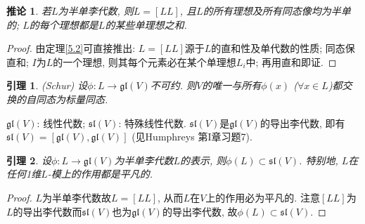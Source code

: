 \documentclass{ctexart}%
\newtheorem{lemma}{引理}
\newtheorem{corollary}{推论}
\theoremstyle{definition}
\theoremstyle{remark}
\begin{document}
\begin{corollary}
若$L$为半单李代数, 则$L=[LL]$, 且$L$的所有理想及所有同态像均为半单的; $L$的每个理想都是$L$的某些单理想之和.
\end{corollary}
\begin{proof}
由定理\ref{5.2}可直接推出: $L=[LL]$源于$L$的直和性及单代数的性质; 同态保直和; $I$为$L$的一个理想, 则其每个元素必在某个单理想$L_i$中; 再用直和即证.
\end{proof}


\begin{lemma}(Schur) 设$\phi\colon L\rightarrow \mathfrak{gl}(V)$不可约. 则$V$的唯一与所有$\phi(x)$ ($\forall x\in L$)都交换的自同态为标量同态.
\end{lemma}

$\mathfrak{gl}(V)$: 线性代数; $\mathfrak{sl}(V)$: 特殊线性代数. $\mathfrak{sl}(V)$是$\mathfrak{gl}(V)$的导出李代数, 即有$\mathfrak{sl}(V)=[\mathfrak{gl}(V),\mathfrak{gl}(V)]$ (见Humphreys 第I章习题7).

\begin{lemma}\label{6.3}
设$\phi\colon L\rightarrow \mathfrak{gl}(V)$为半单李代数$L$的表示, 则$\phi(L)\subset \mathfrak{sl}(V)$. 特别地, $L$在任何1维$L$-模上的作用都是平凡的.
\end{lemma}
\begin{proof}
$L$为半单李代数故$L=[LL]$, 从而$L$在$V$上的作用必为平凡的. 注意$[LL]$为$L$的导出李代数而$\mathfrak{sl}(V)$也为$\mathfrak{gl}(V)$的导出李代数, 故$\phi(L)\subset \mathfrak{sl}(V)$.
\end{proof}
\end{document}
